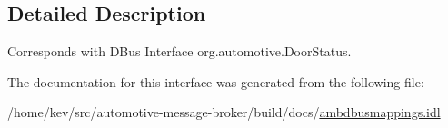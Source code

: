 \subsection{Detailed Description}
Corresponds with D\+Bus Interface org.\+automotive.\+Door\+Status. 

The documentation for this interface was generated from the following file\+:\begin{DoxyCompactItemize}
\item 
/home/kev/src/automotive-\/message-\/broker/build/docs/\hyperlink{ambdbusmappings_8idl}{ambdbusmappings.\+idl}\end{DoxyCompactItemize}
